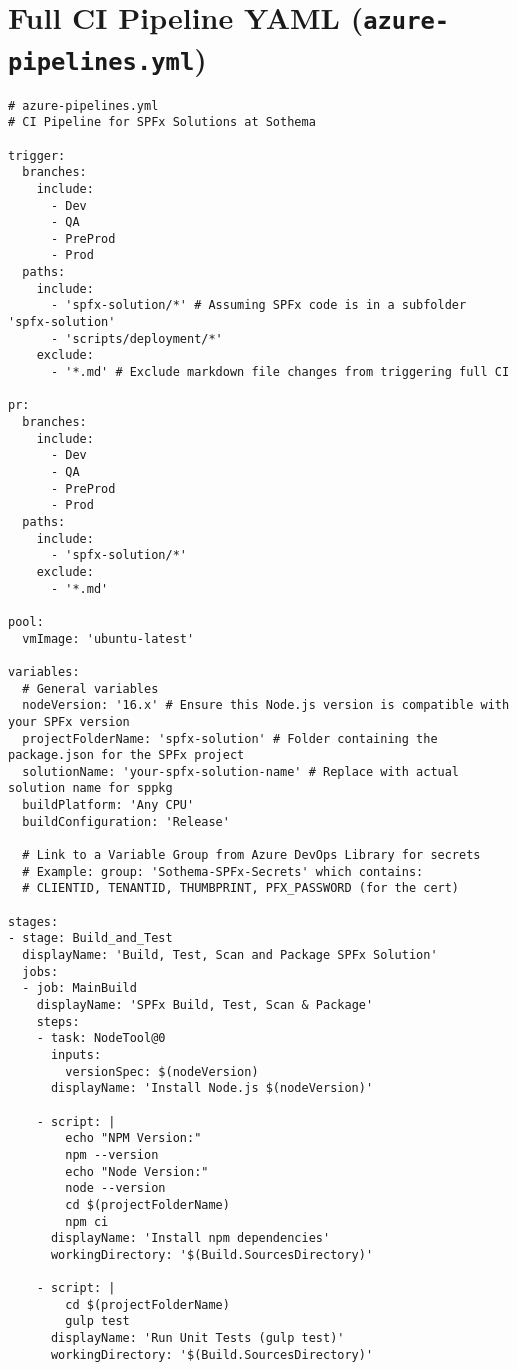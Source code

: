 
\chapter{Full CI Pipeline YAML (\texttt{azure-pipelines.yml})}
\label{appendix:CIPipelineYAML}

\begin{verbatim}
# azure-pipelines.yml
# CI Pipeline for SPFx Solutions at Sothema

trigger:
  branches:
    include:
      - Dev
      - QA
      - PreProd
      - Prod
  paths:
    include:
      - 'spfx-solution/*' # Assuming SPFx code is in a subfolder 'spfx-solution'
      - 'scripts/deployment/*'
    exclude:
      - '*.md' # Exclude markdown file changes from triggering full CI

pr:
  branches:
    include:
      - Dev
      - QA
      - PreProd
      - Prod
  paths:
    include:
      - 'spfx-solution/*'
    exclude:
      - '*.md'

pool:
  vmImage: 'ubuntu-latest'

variables:
  # General variables
  nodeVersion: '16.x' # Ensure this Node.js version is compatible with your SPFx version
  projectFolderName: 'spfx-solution' # Folder containing the package.json for the SPFx project
  solutionName: 'your-spfx-solution-name' # Replace with actual solution name for sppkg
  buildPlatform: 'Any CPU'
  buildConfiguration: 'Release'

  # Link to a Variable Group from Azure DevOps Library for secrets
  # Example: group: 'Sothema-SPFx-Secrets' which contains:
  # CLIENTID, TENANTID, THUMBPRINT, PFX_PASSWORD (for the cert)

stages:
- stage: Build_and_Test
  displayName: 'Build, Test, Scan and Package SPFx Solution'
  jobs:
  - job: MainBuild
    displayName: 'SPFx Build, Test, Scan & Package'
    steps:
    - task: NodeTool@0
      inputs:
        versionSpec: $(nodeVersion)
      displayName: 'Install Node.js $(nodeVersion)'

    - script: |
        echo "NPM Version:"
        npm --version
        echo "Node Version:"
        node --version
        cd $(projectFolderName)
        npm ci
      displayName: 'Install npm dependencies'
      workingDirectory: '$(Build.SourcesDirectory)'

    - script: |
        cd $(projectFolderName)
        gulp test
      displayName: 'Run Unit Tests (gulp test)'
      workingDirectory: '$(Build.SourcesDirectory)'


\end{verbatim}
